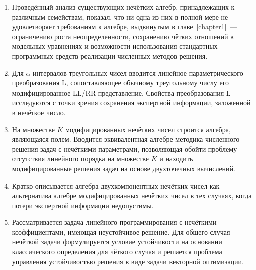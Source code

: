 \begin{enumerate}
  \item Проведённый анализ существующих нечётких алгебр, принадлежащих к различным семействам, показал, что ни одна из них в полной мере не удовлетворяет требованиям к алгебре, выдвинутым в главе~\ref{chapter1}~--- ограничению роста неопределенности, сохранению чётких отношений в модельных уравнениях и возможности использования стандартных программных средств реализации численных методов решения.
  \item Для $\alpha$-интервалов треугольных чисел вводится линейное параметрического преобразования L, сопоставляющее обычному треугольному числу его модифицированное LL/RR-представление. Свойства преобразования L исследуются с точки зрения сохранения экспертной информации, заложенной в нечёткое число.
  \item На множестве $K$ модифицированных нечётких чисел строится алгебра, являющаяся полем. Вводится эквивалентная алгебре методика численного решения задач с нечёткими параметрами, позволяющая обойти проблему отсутствия линейного порядка на множестве $K$ и находить модифицированные решения задач на основе двухточечных вычислений.
  \item Кратко описывается алгебра двухкомпонентных нечётких чисел как альтернатива алгебре модифицированных нечётких чисел в тех случаях, когда потери экспертной информации недопустимы.
  \item Рассматривается задача линейного программирования с нечёткими коэффициентами, имеющая неустойчивое решение. Для общего случая нечёткой задачи формулируется условие устойчивости на основании классического определения для чёткого случая и решается проблема управления устойчивостью решения в виде задачи векторной оптимизации.
\end{enumerate}